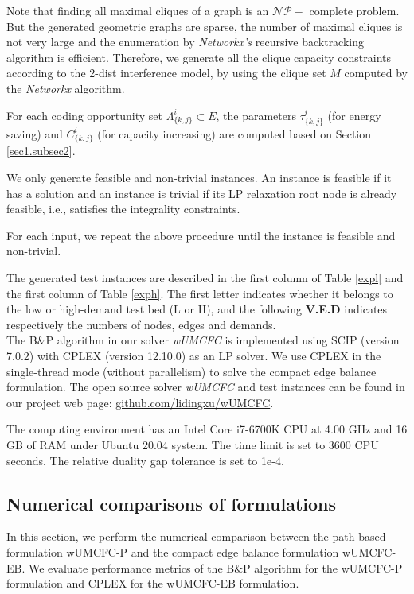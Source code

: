 Note that finding all maximal cliques of a graph is an $\mathcal{NP}-$ complete problem. But the generated geometric graphs are sparse, the number of maximal cliques is not very large and the enumeration by \textit{Networkx's} recursive backtracking algorithm is efficient.
Therefore, we generate all the  clique capacity constraints according to the 2-dist interference model, by using the clique set $M$ computed by the \textit{Networkx} algorithm.
 
For each coding opportunity set \(\Lambda^i_{\{k,j\}} \subset E\), the parameters  \(\tau^i_{\{k,j\}}\) (for energy saving) and \(C^i_{\{k,j\}}\) (for capacity increasing) are computed based on Section \ref{sec1.subsec2}.

We only generate feasible and non-trivial instances. An instance is feasible if it has a solution and an instance is trivial if its LP relaxation root node is already feasible, i.e., satisfies the integrality constraints.

For each input, we repeat the above procedure until the instance is feasible and non-trivial.

The generated test instances are described in the first column of Table \eqref{expl} and the first column of Table \eqref{exph}.
The first letter indicates whether it belongs to the low or high-demand test bed (L or H), and the following \textbf{V.E.D} indicates respectively the numbers of nodes, edges and demands.\\
 
The B\(\&\)P algorithm in our solver \textit{wUMCFC} is implemented using SCIP (version 7.0.2) \cite{gleixneretal2018oo} with CPLEX (version 12.10.0) as an LP solver. We use CPLEX in the single-thread mode (without parallelism) to solve the compact edge balance formulation. The open source solver \textit{wUMCFC}  and test instances can be found in our project web page: \href{https://github.com/lidingxu/wUMCFC}{github.com/lidingxu/wUMCFC}.


The computing environment has an Intel Core i7-6700K CPU at 4.00 GHz and 16 GB of RAM under Ubuntu 20.04 system. The time limit is set to 3600 CPU seconds. The relative duality gap tolerance is set to 1e-4.

\subsection{Numerical comparisons of formulations}
\label{Num}
In this section, we perform the numerical comparison between the path-based formulation wUMCFC-P and the compact edge balance formulation wUMCFC-EB. We evaluate performance metrics of the B\(\&\)P algorithm for the wUMCFC-P formulation and CPLEX for the wUMCFC-EB formulation.

